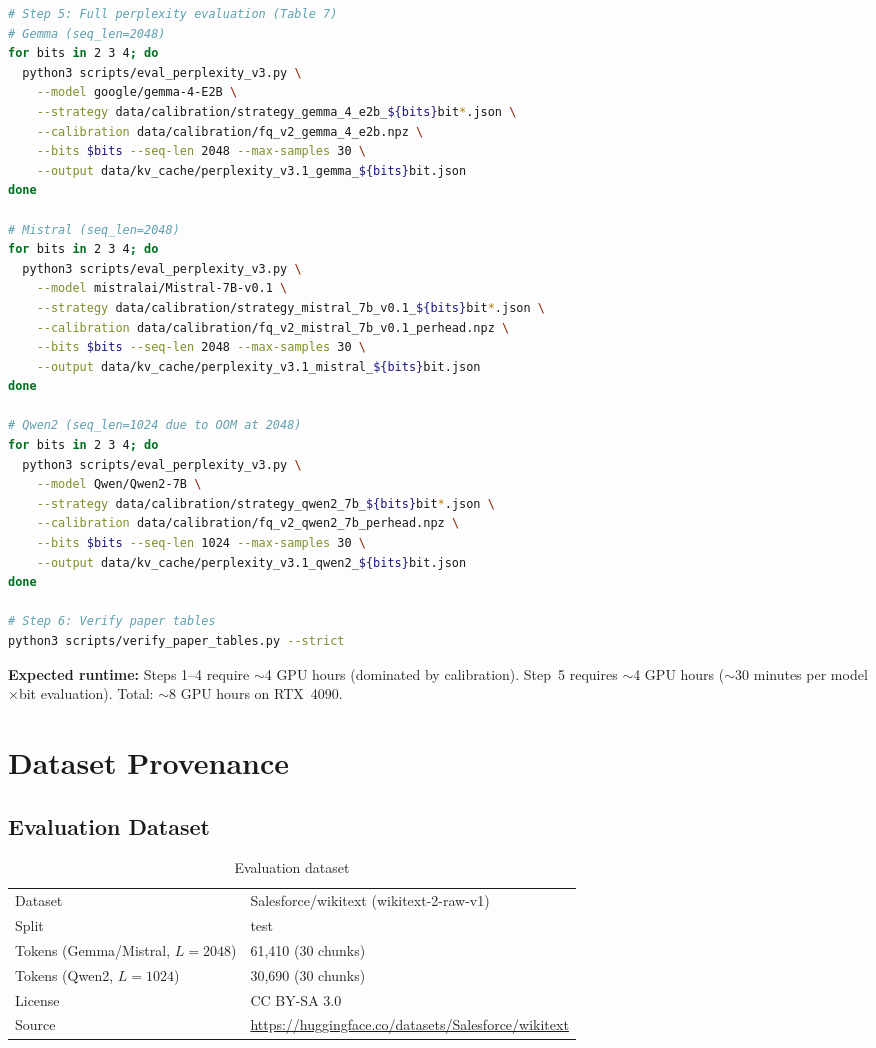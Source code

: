 \documentclass[10pt]{article}
\begin{document}
\begin{lstlisting}[language=bash,caption={Full reproduction pipeline}]
# Step 5: Full perplexity evaluation (Table 7)
# Gemma (seq_len=2048)
for bits in 2 3 4; do
  python3 scripts/eval_perplexity_v3.py \
    --model google/gemma-4-E2B \
    --strategy data/calibration/strategy_gemma_4_e2b_${bits}bit*.json \
    --calibration data/calibration/fq_v2_gemma_4_e2b.npz \
    --bits $bits --seq-len 2048 --max-samples 30 \
    --output data/kv_cache/perplexity_v3.1_gemma_${bits}bit.json
done

# Mistral (seq_len=2048)
for bits in 2 3 4; do
  python3 scripts/eval_perplexity_v3.py \
    --model mistralai/Mistral-7B-v0.1 \
    --strategy data/calibration/strategy_mistral_7b_v0.1_${bits}bit*.json \
    --calibration data/calibration/fq_v2_mistral_7b_v0.1_perhead.npz \
    --bits $bits --seq-len 2048 --max-samples 30 \
    --output data/kv_cache/perplexity_v3.1_mistral_${bits}bit.json
done

# Qwen2 (seq_len=1024 due to OOM at 2048)
for bits in 2 3 4; do
  python3 scripts/eval_perplexity_v3.py \
    --model Qwen/Qwen2-7B \
    --strategy data/calibration/strategy_qwen2_7b_${bits}bit*.json \
    --calibration data/calibration/fq_v2_qwen2_7b_perhead.npz \
    --bits $bits --seq-len 1024 --max-samples 30 \
    --output data/kv_cache/perplexity_v3.1_qwen2_${bits}bit.json
done

# Step 6: Verify paper tables
python3 scripts/verify_paper_tables.py --strict
\end{lstlisting}

\textbf{Expected runtime:} Steps 1--4 require $\sim$4 GPU hours
(dominated by calibration). Step~5 requires $\sim$4 GPU hours
($\sim$30 minutes per model$\times$bit evaluation). Total: $\sim$8 GPU
hours on RTX~4090.

\section{Dataset Provenance}

\subsection{Evaluation Dataset}

\begin{table}[h]
\centering
\small
\caption{Evaluation dataset}
\begin{tabular}{ll}
\toprule
Dataset & Salesforce/wikitext (wikitext-2-raw-v1) \\
Split & test \\
Tokens (Gemma/Mistral, $L{=}2048$) & 61,410 (30 chunks) \\
Tokens (Qwen2, $L{=}1024$) & 30,690 (30 chunks) \\
License & CC BY-SA 3.0 \\
Source & \url{https://huggingface.co/datasets/Salesforce/wikitext} \\
\bottomrule
\end{tabular}
\end{table}
\end{document}
